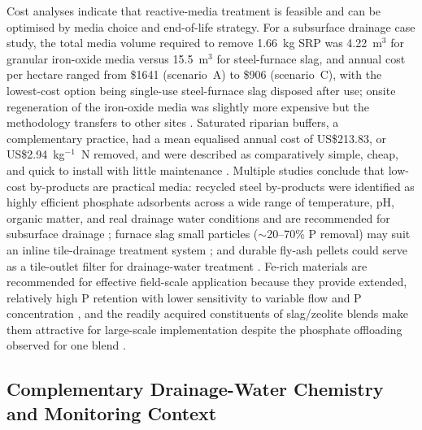Cost analyses indicate that reactive-media treatment is feasible and can be
optimised by media choice and end-of-life strategy. For a subsurface drainage
case study, the total media volume required to remove 1.66~kg SRP was 4.22~m$^3$
for granular iron-oxide media versus 15.5~m$^3$ for steel-furnace slag, and annual
cost per hectare ranged from \$1641 (scenario~A) to \$906 (scenario~C), with the
lowest-cost option being single-use steel-furnace slag disposed after use; onsite
regeneration of the iron-oxide media was slightly more expensive but the
methodology transfers to other sites \parencite{Hauda2020}. Saturated riparian
buffers, a complementary practice, had a mean equalised annual cost of
US\$213.83, or US\$2.94~kg$^{-1}$~N removed, and were described as comparatively
simple, cheap, and quick to install with little maintenance
\parencite{Jaynes2019}. Multiple studies conclude that low-cost by-products are
practical media: recycled steel by-products were identified as highly efficient
phosphate adsorbents across a wide range of temperature, pH, organic matter, and
real drainage water conditions and are recommended for subsurface drainage
\parencite{Sellner2019b}; furnace slag small particles ($\sim$20--70\% P removal)
may suit an inline tile-drainage treatment system \parencite{Sanford2016}; and
durable fly-ash pellets could serve as a tile-outlet filter for drainage-water
treatment \parencite{Li2017}. Fe-rich materials are recommended for effective
field-scale application because they provide extended, relatively high P retention
with lower sensitivity to variable flow and P concentration
\parencite{Pugliese2023}, and the readily acquired constituents of slag/zeolite
blends make them attractive for large-scale implementation despite the phosphate
offloading observed for one blend \parencite{Agrawal2011b}.

\subsection{Complementary Drainage-Water Chemistry and Monitoring Context}

